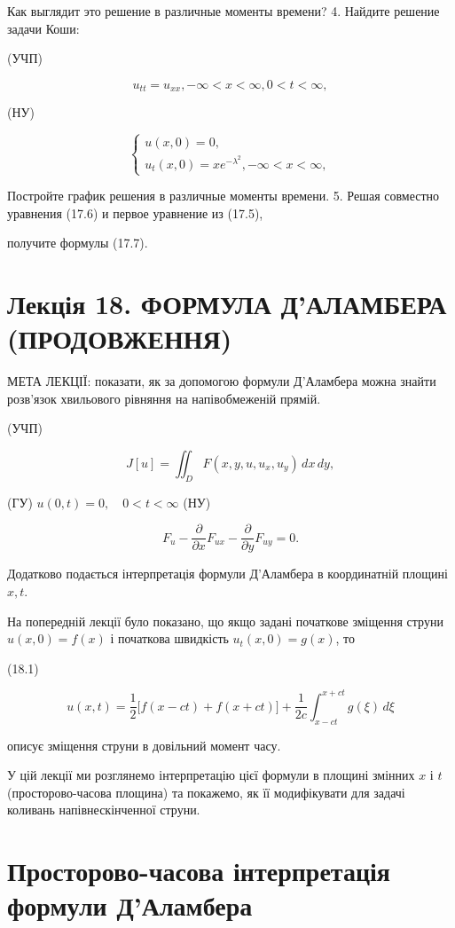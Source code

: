 \documentclass[
  ukrainian,
]{article}
\begin{document}
Как выглядит это решение в различные моменты времени? 4. Найдите решение
задачи Коши:

(УЧП)

\[
u_{tt} = u_{xx}, -\infty < x < \infty, 0 < t < \infty,
\]

(НУ)

\[
\begin{cases} u(x, 0) = 0, \\ u_t(x, 0) = xe^{-\lambda^2}, -\infty < x < \infty, \end{cases}
\]

Постройте график решения в различные моменты времени. 5. Решая совместно
уравнения (17.6) и первое уравнение из (17.5),

получите формулы (17.7).

\section{Лекція 18. ФОРМУЛА Д'АЛАМБЕРА
(ПРОДОВЖЕННЯ)}\label{ux43bux435ux43aux446ux456ux44f-18.-ux444ux43eux440ux43cux443ux43bux430-ux434ux430ux43bux430ux43cux431ux435ux440ux430-ux43fux440ux43eux434ux43eux432ux436ux435ux43dux43dux44f}

МЕТА ЛЕКЦІЇ: показати, як за допомогою формули Д'Аламбера можна знайти
розв'язок хвильового рівняння на напівобмеженій прямій.

(УЧП)

\[
J[u] = \iint_D F(x, y, u, u_x, u_y)\,dx\,dy,
\]

(ГУ) \(u(0, t) = 0,\quad 0 < t < \infty\) (НУ)

\[
F_u - \frac{\partial}{\partial x}F_{ux} - \frac{\partial}{\partial y}F_{uy} = 0.
\]

Додатково подається інтерпретація формули Д'Аламбера в координатній
площині \(x, t\).

На попередній лекції було показано, що якщо задані початкове зміщення
струни \(u(x,0)=f(x)\) і початкова швидкість \(u_t(x,0)=g(x)\), то

(18.1)

\[
u(x,t)=\frac{1}{2}\big[f(x-ct)+f(x+ct)\big]+\frac{1}{2c}\int_{x-ct}^{x+ct} g(\xi)\,d\xi
\]

описує зміщення струни в довільний момент часу.

У цій лекції ми розглянемо інтерпретацію цієї формули в площині змінних
\(x\) і \(t\) (просторово-часова площина) та покажемо, як її
модифікувати для задачі коливань напівнескінченної струни.

\section{Просторово-часова інтерпретація формули
Д'Аламбера}\label{ux43fux440ux43eux441ux442ux43eux440ux43eux432ux43e-ux447ux430ux441ux43eux432ux430-ux456ux43dux442ux435ux440ux43fux440ux435ux442ux430ux446ux456ux44f-ux444ux43eux440ux43cux443ux43bux438-ux434ux430ux43bux430ux43cux431ux435ux440ux430}
\end{document}
